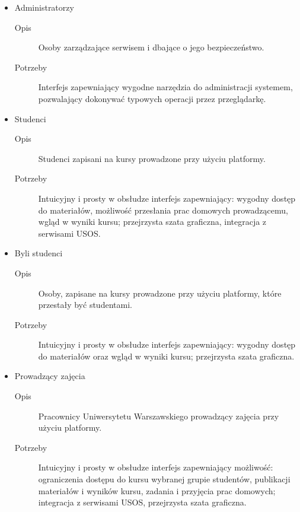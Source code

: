 \documentclass{pracamgr}
\begin{document}
\begin{itemize}
   \item Administratorzy
      \begin{description}
         \item[Opis] Osoby zarządzające serwisem i dbające o jego bezpieczeństwo.
         \item[Potrzeby] Interfejs zapewniający wygodne narzędzia do 
            administracji systemem, pozwalający dokonywać typowych operacji 
            przez przeglądarkę.
      \end{description}
   \item Studenci
      \begin{description}
         \item[Opis] Studenci zapisani na kursy prowadzone przy użyciu platformy.
         \item[Potrzeby] Intuicyjny i prosty w obsłudze interfejs zapewniający: 
            wygodny dostęp do materiałów, możliwość przesłania prac domowych 
            prowadzącemu, wgląd w wyniki kursu; przejrzysta szata graficzna, 
            integracja z serwisami USOS. 
      \end{description}  
   \item Byli studenci
      \begin{description}
         \item[Opis] Osoby, zapisane na kursy prowadzone przy użyciu platformy, 
            które przestały być studentami.
         \item[Potrzeby] Intuicyjny i prosty w obsłudze interfejs zapewniający: 
            wygodny dostęp do materiałów oraz wgląd w wyniki kursu; przejrzysta 
            szata graficzna.
      \end{description}  
   \item Prowadzący zajęcia
      \begin{description}
         \item[Opis] Pracownicy Uniwersytetu Warszawskiego prowadzący zajęcia 
            przy użyciu platformy.
         \item[Potrzeby] Intuicyjny i prosty w obsłudze interfejs zapewniający 
            możliwość: ograniczenia dostępu do kursu wybranej grupie
            studentów, publikacji materiałów i wyników kursu, zadania i 
            przyjęcia prac domowych; integracja z serwisami USOS, przejrzysta 
            szata graficzna.
      \end{description}  
\end{itemize}
\end{document}
